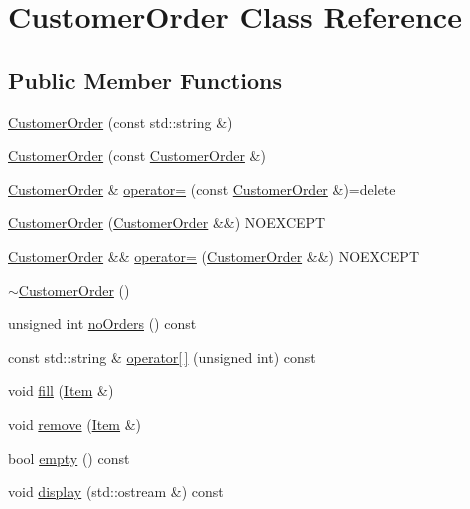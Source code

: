 \hypertarget{classCustomerOrder}{}\section{Customer\+Order Class Reference}
\label{classCustomerOrder}
\subsection*{Public Member Functions}
\begin{DoxyCompactItemize}
\item 
\mbox{\hyperlink{classCustomerOrder_a0b43beee099ac2772cadd8f3df890701}{Customer\+Order}} (const std\+::string \&)
\item 
\mbox{\hyperlink{classCustomerOrder_ad5d7da49c28e5006f326e1709b072516}{Customer\+Order}} (const \mbox{\hyperlink{classCustomerOrder}{Customer\+Order}} \&)
\item 
\mbox{\hyperlink{classCustomerOrder}{Customer\+Order}} \& \mbox{\hyperlink{classCustomerOrder_ae43fcf650924cf82800c6dfe9a20afca}{operator=}} (const \mbox{\hyperlink{classCustomerOrder}{Customer\+Order}} \&)=delete
\item 
\mbox{\hyperlink{classCustomerOrder_addc080f9b7685c1c2d788b418bca40a8}{Customer\+Order}} (\mbox{\hyperlink{classCustomerOrder}{Customer\+Order}} \&\&) N\+O\+E\+X\+C\+E\+PT
\item 
\mbox{\hyperlink{classCustomerOrder}{Customer\+Order}} \&\& \mbox{\hyperlink{classCustomerOrder_aa500234981e09ab8924631d8a74c9fca}{operator=}} (\mbox{\hyperlink{classCustomerOrder}{Customer\+Order}} \&\&) N\+O\+E\+X\+C\+E\+PT
\item 
\mbox{\hyperlink{classCustomerOrder_ae36af98287386c97b66537ac463b09c6}{$\sim$\+Customer\+Order}} ()
\item 
unsigned int \mbox{\hyperlink{classCustomerOrder_a371158bfa7784275a71ebfd9feb8514b}{no\+Orders}} () const
\item 
const std\+::string \& \mbox{\hyperlink{classCustomerOrder_a8ff1239910926e660ce7692807a7847d}{operator\mbox{[}$\,$\mbox{]}}} (unsigned int) const
\item 
void \mbox{\hyperlink{classCustomerOrder_a317213ffac6bc2765e573893bd3f8507}{fill}} (\mbox{\hyperlink{classItem}{Item}} \&)
\item 
void \mbox{\hyperlink{classCustomerOrder_a8059d5a73bfa388f86671d45835468d6}{remove}} (\mbox{\hyperlink{classItem}{Item}} \&)
\item 
bool \mbox{\hyperlink{classCustomerOrder_a8cfde59bf7a044e21508f5b595e3873c}{empty}} () const
\item 
void \mbox{\hyperlink{classCustomerOrder_a44b8223600dd858b4d4edcbe3704a5a0}{display}} (std\+::ostream \&) const
\end{DoxyCompactItemize}


